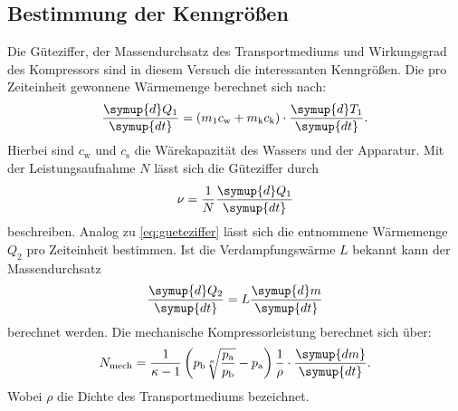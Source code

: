 \subsection{Bestimmung der Kenngrößen}
\label{sec:BdK}
Die Güteziffer, der Massendurchsatz des Transportmediums und Wirkungsgrad des Kompressors sind in diesem Versuch die 
interessanten Kenngrößen.
Die pro Zeiteinheit gewonnene Wärmemenge berechnet sich nach:
\begin{equation}
	\frac{\symup{d}Q_1}{\symup{dt}}=(m_1c_{\text{w}}+m_{\text{k}}c_{\text{k}})\cdot \frac{\symup{d}T_1}{\symup{dt}}.
	\label{eq:gueteziffer}
\end{equation}
Hierbei sind $c_{\text{w}}$ und $c_{\text{s}}$ die Wärekapazität des Wassers und der Apparatur.
Mit der Leistungsaufnahme $N$ lässt sich die Güteziffer durch
\begin{equation}
	\nu=\frac{1}{N}\frac{\symup{d}Q_1}{\symup{dt}}
    \label{eq:leistung}
\end{equation}
beschreiben.
Analog zu \eqref{eq:gueteziffer} lässt sich die entnommene Wärmemenge $Q_2$ pro Zeiteinheit bestimmen.
Ist die Verdampfungswärme $L$ bekannt kann der Massendurchsatz
\begin{equation}
	\frac{\symup{d}Q_2}{\symup{dt}}=L\frac{\symup{d}m}{\symup{dt}}
	\label{eq:massendurchsatz}
\end{equation}
berechnet werden.
Die mechanische Kompressorleistung berechnet sich über:
\begin{equation}
	N_{\text{mech}} = \frac{1}{\kappa - 1} \left( p_{\text{b}} \sqrt[\kappa]{\frac{p_{\text{a}}}{p_{\text{b}}}} -p_{\text{a}} 
\right) \frac{1}{\rho} \cdot \frac{\symup{dm}}{\symup{dt}} .
	\label{eq:arbeit}
\end{equation}
Wobei $\rho$ die Dichte des Transportmediums bezeichnet.
